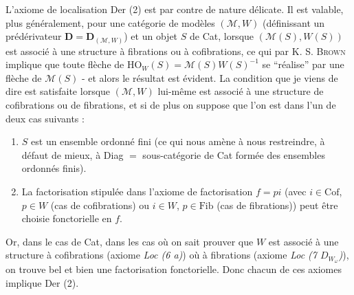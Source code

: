 \documentclass[11pt]{article}
\newcommand{\msp}[1]{\marginpar{\footnotesize [#1]}}
\begin{document}
L'axiome de localisation Der (2) est par contre de nature délicate. Il est valable, plus généralement, pour une catégorie de modèles $(\mathcal{M},W)$ (définissant un prédérivateur $\mathbf{D} = \mathbf{D}_{(\mathcal{M},W)}$) et un objet $S$ de Cat, lorsque $(\mathcal{M}(S),W(S))$ est associé à une structure à fibrations ou à cofibrations, ce qui par K. S. \textsc{Brown} implique que toute flèche de $\mathrm{HO}_W(S) = \mathcal{M}(S)W(S)^{-1}$ se “réalise” par une flèche de $\mathcal{M}(S)$ - et alors le résultat est évident. La condition que je viens de dire est satisfaite lorsque $(\mathcal{M},W)$ lui-même est associé à une structure de cofibrations ou de fibrations,
\msp{page 110}
et si de plus on suppose que l'on est dans l'un de deux cas suivants : %
\begin{enumerate}[label=\alph*)]
\item $S$ est un ensemble ordonné fini (ce qui nous amène à nous restreindre, à défaut de mieux, à Diag $=$ sous-catégorie de Cat formée des ensembles ordonnés finis).
\item La factorisation stipulée dans l'axiome de factorisation $f = pi$ (avec $i \in \mathrm{Cof}$, $p \in W$ (cas de cofibrations) ou $i \in W$, $p \in \mathrm{Fib}$ (cas de fibrations)) peut être choisie fonctorielle en $f$.
\end{enumerate}
Or, dans le cas de Cat, dans les cas où on sait prouver que $W$ est associé à une structure à cofibrations (axiome \textit{Loc (6 a)}) où à fibrations (axiome \textit{Loc (7 $D_{W_\omega}$)}), on trouve bel et bien une factorisation fonctorielle. Donc chacun de ces axiomes implique Der (2). %
\end{document}
